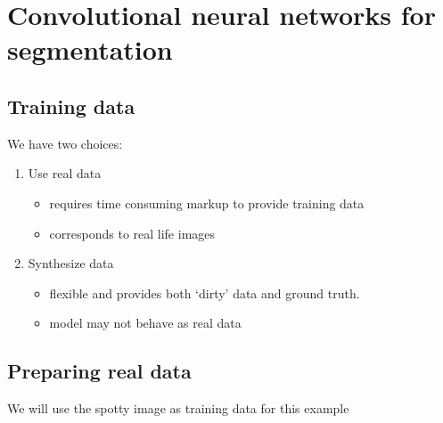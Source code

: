 \documentclass[letterpaper,10pt,english]{sphinxmanual}
\begin{document}
\chapter{Convolutional neural networks for segmentation}
\label{\detokenize{ML4NeutronImageSegmentation:convolutional-neural-networks-for-segmentation}}
\begin{sphinxVerbatim}[commandchars=\\\{\}]
   
   
   
\end{sphinxVerbatim}


\section{Training data}
\label{\detokenize{ML4NeutronImageSegmentation:training-data}}
We have two choices:
\begin{enumerate}
%
\item {} 
Use real data
\begin{itemize}
\item {} 
requires time consuming markup to provide training data

\item {} 
corresponds to real life images

\end{itemize}

\item {} 
Synthesize data
\begin{itemize}
\item {} 
flexible and provides both ‘dirty’ data and ground truth.

\item {} 
model may not behave as real data

\end{itemize}

\end{enumerate}


\section{Preparing real data}
\label{\detokenize{ML4NeutronImageSegmentation:preparing-real-data}}
We will use the spotty image as training data for this example
\end{document}
